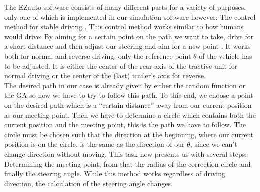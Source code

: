 The EZauto software consists of many different parts for a variety of purposes, only one of which is implemented in our simulation software however: The control method for stable driving \cite{12}. 
This control method works similar to how humans would drive: By aiming for a certain point on the path we want to take, drive for a short distance and then adjust our steering and aim for a new point \cite{31,32}. It works both for normal and reverse driving, only the reference point $\theta$ of the vehicle has to be adjusted. It is either the center of the rear axis of the tractive unit for normal driving or the center of the (last) trailer's axis for reverse. \\
The desired path in our case is already given by either the random function or the GA so now we have to try to follow this path. To this end, we choose a point on the desired path which is a "`certain distance"' away from our current position as our meeting point. Then we have to determine a circle which contains both the current position and the meeting point, this is the path we have to follow. The circle must be chosen such that the direction at the beginning, where our current position is on the circle, is the same as the direction of our $\theta$, since we can't change direction without moving.
This task now presents us with several steps: Determining the meeting point, from that the radius of the correction circle and finally the steering angle. While this method works regardless of driving direction, the calculation of the steering angle changes.

